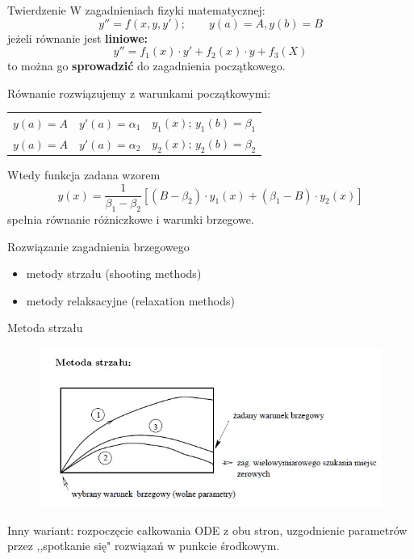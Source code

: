 \begin{frame}
	\begin{block}{Twierdzenie}
		W zagadnieniach fizyki matematycznej:
        $$y'' = f(x,y,y');\qquad y(a) = A, y(b) = B$$
        jeżeli równanie jest \textbf{liniowe:}
        $$y'' = f_1(x)\cdot y'+f_2(x)\cdot y + f_3(X)$$
        to można go \textbf{sprowadzić} do zagadnienia początkowego.
	\end{block}
\end{frame}
\begin{frame}
	Równanie rozwiązujemy z warunkami początkowymi:
    \begin{center}
    	\begin{tabular}{ccc}
    		$y(a) = A$ & $y'(a)=\alpha_1$ & $y_1(x)$;   $y_1(b) = \beta_1$\\
        	$y(a) = A$ & $y'(a)=\alpha_2$ & $y_2(x)$;   $y_2(b) = \beta_2$
    	\end{tabular}
    \end{center}
    Wtedy funkcja zadana wzorem
    $$y(x) = \frac{1}{\beta_1-\beta_2}[(B-\beta_2)\cdot y_1(x)+(\beta_1-B)\cdot y_2(x)]$$
    spełnia równanie różniczkowe i warunki brzegowe.\newline
    \begin{block}{Rozwiązanie zagadnienia brzegowego}
    	\begin{itemize}
          \item metody strzału (shooting methods)
          \item metody relaksacyjne (relaxation methods)
    	\end{itemize}
    \end{block}
\end{frame}
\begin{frame}{Metoda strzału}
	\begin{figure}
		\includegraphics[height=0.55\textheight]{img/strzal.jpg}
	\end{figure} 
    Inny wariant:\newline
    \qquad rozpoczęcie całkowania ODE z obu stron, uzgodnienie parametrów przez ,,spotkanie się" rozwiązań w punkcie środkowym.
\end{frame}
